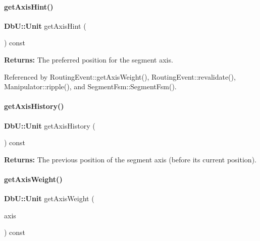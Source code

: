 \mbox{\label{classKite_1_1RoutingEvent_ab94e1b7e323c5344019d6ea545e3ea05}} 
\paragraph{\texorpdfstring{get\+Axis\+Hint()}{getAxisHint()}}
{\footnotesize\ttfamily \textbf{ Db\+U\+::\+Unit} get\+Axis\+Hint (\begin{DoxyParamCaption}{ }\end{DoxyParamCaption}) const\hspace{0.3cm}{\ttfamily [inline]}}

{\bfseries Returns\+:} The preferred position for the segment axis. 

Referenced by Routing\+Event\+::get\+Axis\+Weight(), Routing\+Event\+::revalidate(), Manipulator\+::ripple(), and Segment\+Fsm\+::\+Segment\+Fsm().

\mbox{\label{classKite_1_1RoutingEvent_ad1c8d7db376d2e0b99eb1f54df29dc71}} 
\paragraph{\texorpdfstring{get\+Axis\+History()}{getAxisHistory()}}
{\footnotesize\ttfamily \textbf{ Db\+U\+::\+Unit} get\+Axis\+History (\begin{DoxyParamCaption}{ }\end{DoxyParamCaption}) const\hspace{0.3cm}{\ttfamily [inline]}}

{\bfseries Returns\+:} The previous position of the segment axis (before it\textquotesingle{}s current position). \mbox{\label{classKite_1_1RoutingEvent_aef5716e4b434aae813b1067a908f8b1a}} 
\paragraph{\texorpdfstring{get\+Axis\+Weight()}{getAxisWeight()}}
{\footnotesize\ttfamily \textbf{ Db\+U\+::\+Unit} get\+Axis\+Weight (\begin{DoxyParamCaption}\item[{\textbf{ Db\+U\+::\+Unit}}]{axis }\end{DoxyParamCaption}) const\hspace{0.3cm}{\ttfamily [inline]}}

